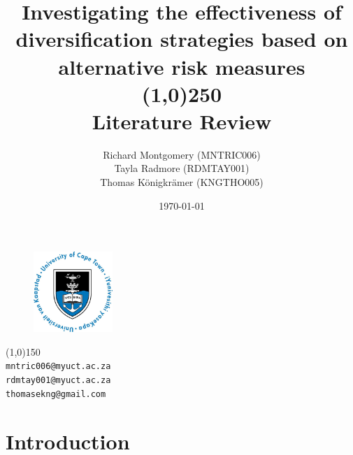 \documentclass[12pt,a4paper]{article}
\begin{document}
\begin{titlepage}

\title{Investigating the effectiveness of diversification strategies based on alternative risk measures\\
\line(1,0){250}\\
\large Literature Review}

\date{\today}

\author{Richard Montgomery (MNTRIC006)\\
Tayla Radmore (RDMTAY001)\\
Thomas K{\"o}nigkr{\"a}mer (KNGTHO005)}

\maketitle

\begin{figure}

\begin{center}
\includegraphics[width=3cm]{UCTlogo.jpg}\\[1cm]
\end{center}

\end{figure}

\begin{center}
\line(1,0){150}\\
{\tt mntric006@myuct.ac.za}\\
{\tt rdmtay001@myuct.ac.za}\\
{\tt thomasekng@gmail.com}
\end{center}

\thispagestyle{empty}

\end{titlepage}


\tableofcontents

\newpage


\section{Introduction}
\label{sec:Intro}
\end{document}

